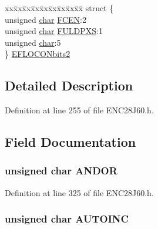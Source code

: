 \begin{DoxyCompactItemize}
\begin{tabbing}
\end{tabbing}\item 
\begin{tabbing}
xx\=xx\=xx\=xx\=xx\=xx\=xx\=xx\=xx\=\kill
struct \{\\
\>unsigned \hyperlink{union___r_e_g_afe71f11dacb15682cdc012f7208e6e09}{char} \hyperlink{union___r_e_g_a81b3685c69f9031d5172f47f209c1f34}{FCEN}:2\\
\>unsigned \hyperlink{union___r_e_g_afe71f11dacb15682cdc012f7208e6e09}{char} \hyperlink{union___r_e_g_a7c4278678dc4cf95998b60faa33638f2}{FULDPXS}:1\\
\>unsigned \hyperlink{union___r_e_g_afe71f11dacb15682cdc012f7208e6e09}{char}:5\\
\} \hyperlink{union___r_e_g_a21c42c09c1cfa98847b2a1048bfdf1a7}{EFLOCONbits2}\\

\end{tabbing}\end{DoxyCompactItemize}


\subsection{Detailed Description}


Definition at line 255 of file E\+N\+C28\+J60.\+h.



\subsection{Field Documentation}
\hypertarget{union___r_e_g_a3e49db67b0b1807da80b1580c5bf80bc}{}
\subsubsection[{A\+N\+D\+O\+R}]{\setlength{\rightskip}{0pt plus 5cm}unsigned {\bf char} A\+N\+D\+O\+R}\label{union___r_e_g_a3e49db67b0b1807da80b1580c5bf80bc}


Definition at line 325 of file E\+N\+C28\+J60.\+h.

\hypertarget{union___r_e_g_aa5c965ad4ba093b420b10fa434a9ed35}{}
\subsubsection[{A\+U\+T\+O\+I\+N\+C}]{\setlength{\rightskip}{0pt plus 5cm}unsigned {\bf char} A\+U\+T\+O\+I\+N\+C}\label{union___r_e_g_aa5c965ad4ba093b420b10fa434a9ed35}


